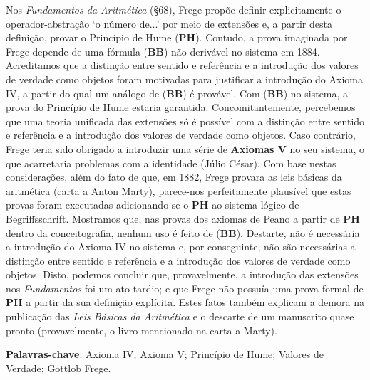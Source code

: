 \documentclass[12pt]{abntex2}
\begin{document}
\begin{resumo}
Nos \textit{Fundamentos da Aritmética} (§68), Frege propõe definir explicitamente o operador-abstração `o número de...' por meio de extensões e, a partir desta definição, provar o Princípio de Hume (\textbf{PH}). Contudo, a prova imaginada por Frege depende de uma fórmula (\textbf{BB}) não derivável no sistema em 1884. Acreditamos que a distinção entre sentido e referência e a introdução dos valores de verdade como objetos foram motivadas para justificar a introdução do Axioma IV, a partir do qual um análogo de (\textbf{BB}) é provável. Com (\textbf{BB}) no sistema, a prova do Princípio de Hume estaria garantida. Concomitantemente, percebemos que uma teoria unificada das extensões só é possível com a distinção entre sentido e referência e a introdução dos valores de verdade como objetos. Caso contrário, Frege teria sido obrigado a introduzir uma série de \textbf{Axiomas V} no seu sistema, o que acarretaria problemas com a identidade (Júlio César). Com base nestas considerações, além do fato de que, em 1882, Frege provara as leis básicas da aritmética (carta a Anton Marty), parece-nos perfeitamente plausível que estas provas foram executadas adicionando-se o \textbf{PH} ao sistema lógico de Begriffsschrift. Mostramos que, nas provas dos axiomas de Peano a partir de \textbf{PH} dentro da conceitografia, nenhum uso é feito de (\textbf{BB}). Destarte, não é necessária a introdução do Axioma IV no sistema e, por conseguinte, não são necessárias a distinção entre sentido e referência e a introdução dos valores de verdade como objetos. Disto, podemos concluir que, provavelmente, a introdução das extensões nos \textit{Fundamentos} foi um ato tardio; e que Frege não possuía uma prova formal de \textbf{PH} a partir da sua definição explícita. Estes fatos também explicam a demora na publicação das \textit{Leis Básicas da Aritmética} e o descarte de um manuscrito quase pronto (provavelmente, o livro mencionado na carta a Marty). 
\vspace{\onelineskip} 
\noindent
\par
\textbf{Palavras-chave}: Axioma IV; Axioma V; Princípio de Hume; Valores de Verdade; Gottlob Frege. 
\end{resumo}
\end{document}
